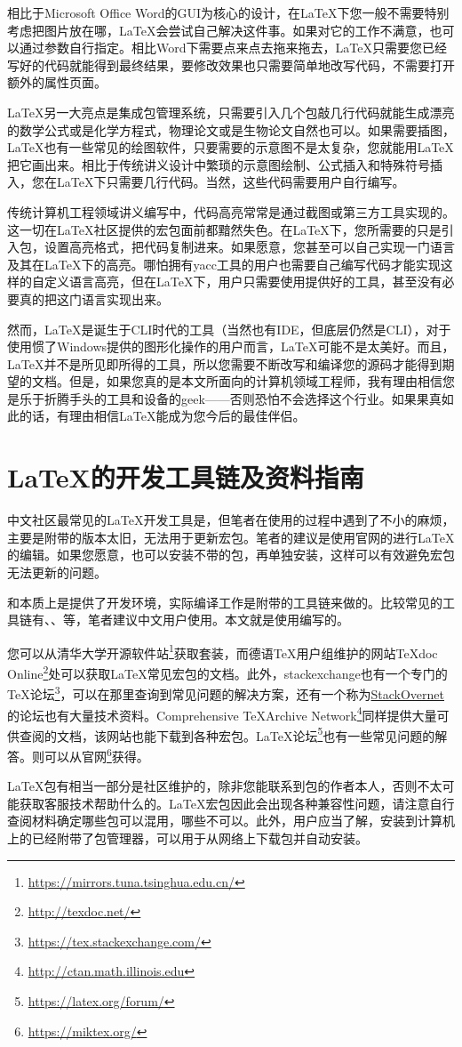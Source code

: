 相比于Microsoft Office Word的GUI为核心的设计，在\LaTeX 下您一般不需要特别考虑把图片放在哪，\LaTeX 会尝试自己解决这件事。如果对它的工作不满意，也可以通过参数自行指定。相比Word下需要点来点去拖来拖去，\LaTeX 只需要您已经写好的代码就能得到最终结果，要修改效果也只需要简单地改写代码，不需要打开额外的属性页面。

\LaTeX 另一大亮点是集成包管理系统，只需要引入几个包敲几行代码就能生成漂亮的数学公式或是化学方程式，物理论文或是生物论文自然也可以。如果需要插图，\LaTeX 也有一些常见的绘图软件，只要需要的示意图不是太复杂，您就能用\LaTeX 把它画出来。相比于传统讲义设计中繁琐的示意图绘制、公式插入和特殊符号插入，您在\LaTeX 下只需要几行代码。当然，这些代码需要用户自行编写。

传统计算机工程领域讲义编写中，代码高亮常常是通过截图或第三方工具实现的。这一切在\LaTeX 社区提供的宏包面前都黯然失色。在\LaTeX 下，您所需要的只是引入包，设置高亮格式，把代码复制进来。如果愿意，您甚至可以自己实现一门语言及其在\LaTeX 下的高亮。哪怕拥有yacc工具的用户也需要自己编写代码才能实现这样的自定义语言高亮，但在\LaTeX 下，用户只需要使用提供好的工具，甚至没有必要真的把这门语言实现出来。

然而，\LaTeX 是诞生于CLI时代的工具（当然也有IDE，但底层仍然是CLI），对于使用惯了Windows提供的图形化操作的用户而言，\LaTeX 可能不是太美好。而且，\LaTeX 并不是所见即所得的工具，所以您需要不断改写和编译您的源码才能得到期望的文档。但是，如果您真的是本文所面向的计算机领域工程师，我有理由相信您是乐于折腾手头的工具和设备的geek——否则恐怕不会选择这个行业。如果果真如此的话，有理由相信\LaTeX 能成为您今后的最佳伴侣。

\section{\LaTeX 的开发工具链及资料指南}

中文社区最常见的\LaTeX 开发工具是\CTeX，但笔者在使用\CTeX 的过程中遇到了不小的麻烦，主要是附带的\MiKTeX 版本太旧，无法用于更新宏包。笔者的建议是使用官网的\MiKTeX 进行\LaTeX 的编辑。如果您愿意，也可以安装不带\MiKTeX 的\CTeX 包，再单独安装\MiKTeX，这样可以有效避免宏包无法更新的问题。

\MiKTeX 和\CTeX 本质上是提供了开发环境，实际编译工作是附带的工具链来做的。比较常见的工具链有\pdfLaTeX、\XeLaTeX、\XeTeX 等，笔者建议中文用户使用\XeLaTeX。本文就是使用\XeLaTeX 编写的。

您可以从清华大学开源软件站\footnote{\url{https://mirrors.tuna.tsinghua.edu.cn/}}获取\CTeX 套装，而德语\TeX 用户组维护的网站\TeX doc Online\footnote{\url{http://texdoc.net/}}处可以获取\LaTeX 常见宏包的文档。此外，stackexchange也有一个专门的\TeX 论坛\footnote{\url{https://tex.stackexchange.com/}}，可以在那里查询到常见问题的解决方案，还有一个称为\href{https://stackovernet.com/}{StackOvernet}的论坛也有大量技术资料。Comprehensive \TeX\;Archive Network\footnote{\url{http://ctan.math.illinois.edu}}同样提供大量可供查阅的文档，该网站也能下载到各种宏包。\LaTeX 论坛\footnote{\url{https://latex.org/forum/}}也有一些常见问题的解答。\MiKTeX 则可以从\MiKTeX 官网\footnote{\url{https://miktex.org/}}获得。

\LaTeX 包有相当一部分是社区维护的，除非您能联系到包的作者本人，否则不太可能获取客服技术帮助什么的。\LaTeX 宏包因此会出现各种兼容性问题，请注意自行查阅材料确定哪些包可以混用，哪些不可以。此外，\MiKTeX 用户应当了解，安装到计算机上的\MiKTeX 已经附带了包管理器，可以用于从网络上下载包并自动安装。